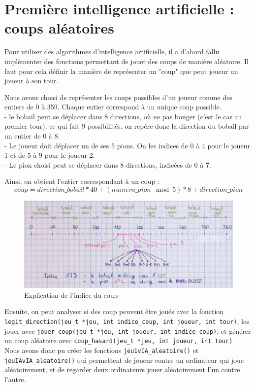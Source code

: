 \documentclass{article}
\begin{document}
\section{Première intelligence artificielle : coups aléatoires}

Pour utiliser des algorithmes d'intelligence artificielle, il a d'abord fallu implémenter des fonctions permettant de jouer des coups de manière aléatoire.
Il faut pour cela définir la manière de représenter un "coup" que peut joueur un joueur à son tour.

Nous avons choisi de représenter les coups possibles d'un joueur comme des entiers de 0 à 359. Chaque entier correspond à un unique coup possible.
\\- le bobail peut se déplacer dans 8 directions, où ne pas bouger (c'est le cas au premier tour), ce qui fait 9 possibilités. on repère donc la direction du bobail par un entier de 0 à 8.
\\- Le joueur doit déplacer un de ses 5 pions. On les indices de 0 à 4 pour le joueur 1 et de 5 à 9 pour le joueur 2.
\\- Le pion choisi peut se déplacer dans 8 directions, indicées de 0 à 7.


Ainsi, on obtient l'entier correspondant à un coup :
$$coup = direction\_bobail * 40 + (numero\_pion\mod 5) * 8 + direction\_pion$$

\begin{figure}[H]
    \centering
    \includegraphics[width=1\linewidth]{explication_indice_coup.jpeg}
    \caption{Explication de l'indice du coup}
    \label{fig:1.5}
\end{figure}

Ensuite, on peut analyser si des coup peuvent être joués avec la fonction {\tt legit\_direction(jeu\_t *jeu, int indice\_coup, int joueur, int tour)}, les jouer avec {\tt jouer\_coup(jeu\_t *jeu, int joueur, int indice\_coup)}, et générer un coup aléatoire avec  {\tt coup\_hasard(jeu\_t *jeu, int joueur, int tour)}
\\Nous avons donc pu créer les fonctions  {\tt jeu1vIA\_aleatoire()} et {\tt jeuIAvIA\_aleatoire()}
qui permettent de joueur contre un ordinateur qui joue aléatoirement, et de regarder deux ordinateurs jouer aléatoirement l'un contre l'autre.
\end{document}
